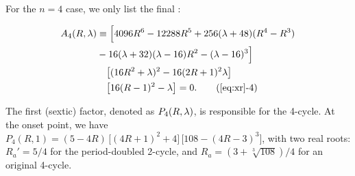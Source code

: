 \documentclass{ws-ijbc}
\begin{document}
For the $n = 4$ case,
%
we only list the final : %
%
\begin{small}
\begin{align}
A_4\Rlam
& \equiv
    \Big[
    4096 R^6-12288 R^5 +
    256 (\lambda + 48) (R^4 - R^3) \notag \\
& -16 (\lambda + 32)(\lambda - 16) R^2
      -(\lambda - 16)^3 \Big] \notag \\
& \quad
    \big[(16 R^2 + \lambda)^2 - 16 (2R+1)^2 \lambda \big] \notag \\
& \quad
    \big[ 16 (R-1)^2 - \lambda \big]
 = 0.
\tag{\ref{eq:xr}-4}
\label{eq:xr4}
\end{align}
\end{small}
%
%
%
The first (sextic) factor, denoted as $P_4(R, \lambda)$,
  is responsible for the 4-cycle.
%
At the onset point, %
we have %
$ P_4(R, 1)
= (
    5 - 4R
  )
\, \big[
  (4R + 1)^2 + 4
  \big]
\, \big[
  108 - (4R - 3)^3
  \big]$,
%
%
%
with two real roots:
$R_a' = 5/4$
for the period-doubled 2-cycle,
and
$R_a = (3+\sqrt[3]{108})/4$
for an original 4-cycle. %
\end{document}
